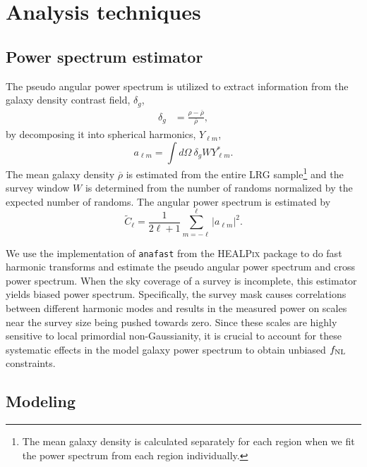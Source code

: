 \section{Analysis techniques}
\label{sec:method} 
 
\subsection{Power spectrum estimator}
The pseudo angular power spectrum \citep{hivon2002master} is utilized to extract information from the galaxy density contrast field, $\delta_{g}$, 
\begin{align}\label{eq:delta}
    \delta_{g} &= \frac{\rho- \overline{\rho}}{\overline{\rho}},
\end{align}
by decomposing it into spherical harmonics, $Y_{\ell m}$,
\begin{equation}
        a_{\ell m} = \int d\Omega ~ \delta_{g} W Y^{*}_{\ell m}.
\end{equation}
The mean galaxy density $\overline{\rho}$ is estimated from the entire LRG sample\footnote{The mean galaxy density is calculated separately for each region when we fit the power spectrum from each region individually.} and the survey window $W$ is determined from the number of randoms normalized by the expected number of randoms. The angular power spectrum is estimated by
\begin{equation}\label{eq:pusedocell}
        \tilde{C}_{\ell} = \frac{1}{2\ell +1} \sum_{m=-\ell}^{\ell} |a_{\ell m}|^{2}.
\end{equation}

We use the implementation of \texttt{anafast} from the \textsc{HEALPix} package \citep{gorski2005healpix} to do fast harmonic transforms and estimate the pseudo angular power spectrum and cross power spectrum. When the sky coverage of a survey is incomplete, this estimator yields biased power spectrum. Specifically, the survey mask causes correlations between different harmonic modes and results in the measured power on scales near the survey size being pushed towards zero. Since these scales are highly sensitive to local primordial non-Gaussianity, it is crucial to account for these systematic effects in the model galaxy power spectrum to obtain unbiased $f_{\rm NL}$ constraints.

 \subsection{Modeling}

